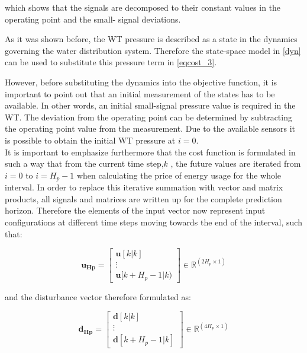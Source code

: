 which shows that the signals are decomposed to their constant values in the operating point and the small- signal deviations. 

As it was shown before, the WT pressure is described as a state in the dynamics governing the water distribution system. Therefore the state-space model in \eqref{dyn} can be used to substitute this pressure term in \eqref{eqcost_3}.

However, before substituting the dynamics into the objective function, it is important to point out that an initial measurement of the states has to be available. In other words, an initial small-signal pressure value is required in the WT. The deviation from the operating point can be determined by subtracting the operating point value from the measurement. 
Due to the available sensors it is possible to obtain the initial WT pressure at $i = 0$. 
\\
\newline
It is important to emphasize furthermore that the cost function is formulated in such a way that from the current time step,$k$ , the future values are iterated from $i = 0$ to $i = H_p - 1$ when calculating the price of energy usage for the whole interval. In order to replace this iterative summation with vector and matrix products, all signals and matrices are written up for the complete prediction horizon. Therefore the elements of the input vector now represent input configurations at different time steps moving towards the end of the interval, such that:

\begin{equation}
\bm{u_{Hp}} =  
 \begin{bmatrix}
  \bm{u}[k|k]\\
  \vdots  \\
  \bm{u}[k+H_p-1|k)   
 \end{bmatrix}
 \in \pmb{\mathbb{R}}^{(2 H_p \times 1)}
 \label{eq:uhp}
\end{equation}

and the disturbance vector therefore formulated as:

\begin{equation}
\bm{d_{Hp}} =  
 \begin{bmatrix}
  \bm{d}[k|k]\\
  \vdots  \\
  \bm{d}[k+H_p-1|k]   
 \end{bmatrix}
 \in \pmb{\mathbb{R}}^{(4 H_p \times 1)}
 \label{eq:dhp}
\end{equation}

